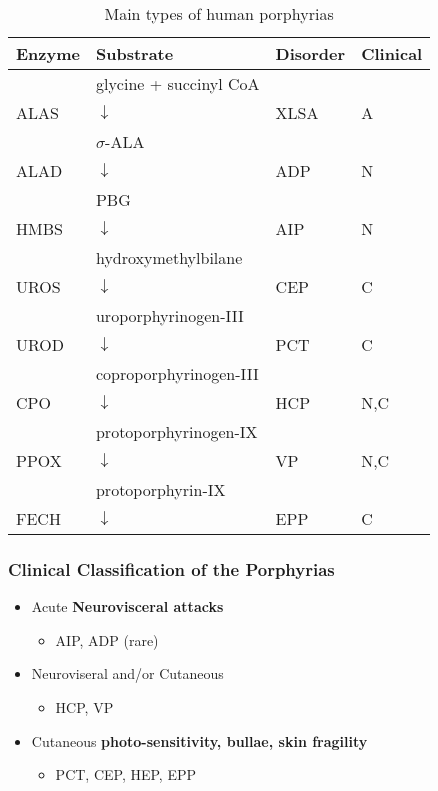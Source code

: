 \documentclass[12pt]{scrartcl}
\begin{document}
\begin{table}[htbp]
\caption{\label{tab:orgfb8a600}Main types of human porphyrias}
\centering
\begin{tabular}{llll}
Enzyme & Substrate & Disorder & Clinical\footnotemark\\
\hline
 & glycine + succinyl CoA &  & \\
ALAS & \(\downarrow\) & XLSA & A\\
 & \(\sigma\)-ALA &  & \\
ALAD & \(\downarrow\) & ADP & N\\
 & PBG &  & \\
HMBS & \(\downarrow\) & AIP & N\\
 & hydroxymethylbilane &  & \\
UROS & \(\downarrow\) & CEP & C\\
 & uroporphyrinogen-III &  & \\
UROD & \(\downarrow\) & PCT & C\\
 & coproporphyrinogen-III &  & \\
CPO & \(\downarrow\) & HCP & N,C\\
 & protoporphyrinogen-IX &  & \\
PPOX & \(\downarrow\) & VP & N,C\\
 & protoporphyrin-IX &  & \\
FECH & \(\downarrow\) & EPP & C\\
\end{tabular}
\end{table}

\subsubsection{Clinical Classification of the Porphyrias}
\label{sec:org63af145}
\begin{itemize}
\item Acute \textbf{Neurovisceral attacks}
\begin{itemize}
\item AIP, ADP (rare)
\end{itemize}

\item Neuroviseral and/or Cutaneous
\begin{itemize}
\item HCP, VP
\end{itemize}

\item Cutaneous \textbf{photo-sensitivity, bullae, skin fragility}
\begin{itemize}
\item PCT, CEP, HEP, EPP
\end{itemize}
\end{itemize}
\end{document}
